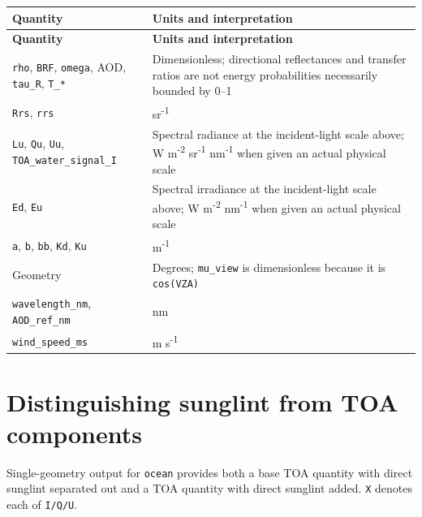 {\TableFont
\begin{longtable}{@{}>{\raggedright\arraybackslash}p{}>{\raggedright\arraybackslash}p{}@{}}
\toprule
\textbf{Quantity} & \textbf{Units and interpretation} \\
\midrule
\endfirsthead
\toprule
\textbf{Quantity} & \textbf{Units and interpretation} \\
\midrule
\endhead
\bottomrule
\endfoot
\texttt{rho}, \texttt{BRF}, \texttt{omega}, AOD, \texttt{tau\_\allowbreak{}R}, \texttt{T\_\allowbreak{}*} & Dimensionless; directional reflectances and transfer ratios are not energy probabilities necessarily bounded by 0--1 \\
\texttt{Rrs}, \texttt{rrs} & sr\textsuperscript{-}\textsuperscript{1} \\
\texttt{Lu}, \texttt{Qu}, \texttt{Uu}, \texttt{TOA\_\allowbreak{}water\_\allowbreak{}signal\_\allowbreak{}I} & Spectral radiance at the incident-light scale above; W m\textsuperscript{-}\textsuperscript{2} sr\textsuperscript{-}\textsuperscript{1} nm\textsuperscript{-}\textsuperscript{1} when given an actual physical scale \\
\texttt{Ed}, \texttt{Eu} & Spectral irradiance at the incident-light scale above; W m\textsuperscript{-}\textsuperscript{2} nm\textsuperscript{-}\textsuperscript{1} when given an actual physical scale \\
\texttt{a}, \texttt{b}, \texttt{bb}, \texttt{Kd}, \texttt{Ku} & m\textsuperscript{-}\textsuperscript{1} \\
Geometry & Degrees; \texttt{mu\_\allowbreak{}view} is dimensionless because it is \texttt{cos(VZA)} \\
\texttt{wavelength\_\allowbreak{}nm}, \texttt{AOD\_\allowbreak{}ref\_\allowbreak{}nm} & nm \\
\texttt{wind\_\allowbreak{}speed\_\allowbreak{}ms} & m s\textsuperscript{-}\textsuperscript{1} \\
\end{longtable}
}

\section{Distinguishing sunglint from TOA components}
\label{sec:auto:05_output_formats:3}
Single-geometry output for \texttt{ocean} provides both a base TOA quantity with direct sunglint separated out and a TOA quantity with direct sunglint added. \texttt{X} denotes each of \texttt{I/\allowbreak{}Q/\allowbreak{}U}.


